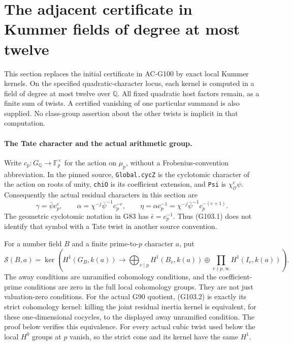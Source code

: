 \section{The adjacent certificate in Kummer fields of degree at most twelve}
\label{sec:cubic-kummer-small-degree}

This section replaces the initial certificate in AC-G100 by exact
local Kummer kernels.  On the specified quadratic-character locus,
each kernel is computed in a field of degree at most twelve over
$\mathbb Q$.  All fixed quadratic host factors remain, as a finite
sum of twists.  A certified vanishing of one particular summand is
also supplied.  No class-group assertion about the other twists is
implicit in that computation.

\paragraph{The Tate character and the actual arithmetic group.}
Write $c_p:G_{\mathbb Q}\to\mathbb F_p^\times$ for the action on
$\mu_p$, without a Frobenius-convention abbreviation.
In the pinned source, \texttt{Global.cycZ} is the cyclotomic
character of the action on roots of unity, \texttt{chiO} is its
coefficient extension, and \texttt{Psi} is $\chi_{\mathcal O}^e\psi$.
Consequently the actual residual characters in this section are
\[
 \gamma=\bar\psi c_p^e,\qquad
 \alpha=\chi^{-j}\bar\psi^{-1}c_p^{-e},\qquad
 \eta=\alpha c_p^{-1}
      =\chi^{-j}\bar\psi^{-1}c_p^{-(e+1)}.
 \tag{G103.1}
\]
The geometric cyclotomic notation in G83 has
$\bar\epsilon=c_p^{-1}$.  Thus (G103.1) does not identify that
symbol with a Tate twist in another source convention.

For a number field $B$ and a finite prime-to-$p$ character $a$, put
\[
 \mathcal S(B,a)=\ker\left(
 H^1(G_B,k(a))\longrightarrow
 \bigoplus_{v\mid p}H^1(B_v,k(a))
 \oplus\prod_{v\nmid p,\infty}H^1(I_v,k(a))\right).
 \tag{G103.2}
\]
The away conditions are unramified cohomology conditions, and the
coefficient-prime conditions are zero in the full local cohomology
groups.  They are not just valuation-zero conditions.
For the actual G90 quotient, (G103.2) is exactly its strict
cohomology kernel: killing the joint residual inertia kernel is
equivalent, for these one-dimensional cocycles, to the displayed
away unramified condition.  The proof below verifies this equivalence.
For every actual cubic twist used below the local $H^0$ groups at
$p$ vanish, so the strict cone and its kernel have the same $H^1$.

